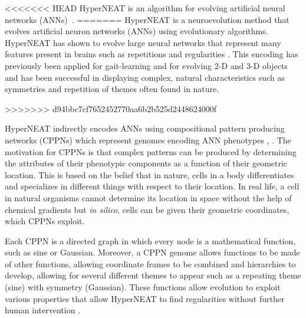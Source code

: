 <<<<<<< HEAD
HyperNEAT is an algorithm for evolving artificial neural networks (ANNs)~\cite{stanley3}. 
=======
HyperNEAT is a neuroevolution method that evolves artificial neuron networks (ANNs) using evolutionary algorithms.
HyperNEAT has shown to evolve large neural networks that represent many features present in brains such as repetitions and regularities \cite{stanley2002evolving}. 
This encoding has previously been applied for gait-learning \cite{yos:clune} and for evolving 2-D and 3-D objects \cite{clune:lipson20113d} and has been successful in displaying complex, natural characteristics such as symmetries and repetition of themes often found in nature.

>>>>>>> d94bbc7cf7652452770aa6b2b525d2448624000f

HyperNEAT indirectly encodes ANNs using compositional pattern producing networks (CPPNs) which represent genomes encoding ANN phenotypes \cite{stanley2009hypercube}, \cite{stanley2007CPPN}. 
The motivation for CPPNs is that complex patterns can be produced by determining the attributes of their phenotypic components as a function of their geometric location. 
This is based on the belief that in nature, cells in a body differentiates and specializes in different things with respect to their location. 
In real life, a cell in natural organisms cannot determine its location in space without the help of chemical gradients but \emph{in silico}, cells can be given their geometric coordinates, which CPPNs exploit. 


Each CPPN is a directed graph in which every node is a mathematical function, such as sine or Gaussian. 
Moreover, a CPPN genome allows functions to be made of other functions, allowing coordinate frames to be combined and hierarchies to develop, allowing for several different themes to appear such as a repeating theme (sine) with symmetry (Gaussian). 
These functions allow evolution to exploit various properties that allow HyperNEAT to find regularities without further human intervention \cite{stanley2009hypercube,clune2009evolving}. %


